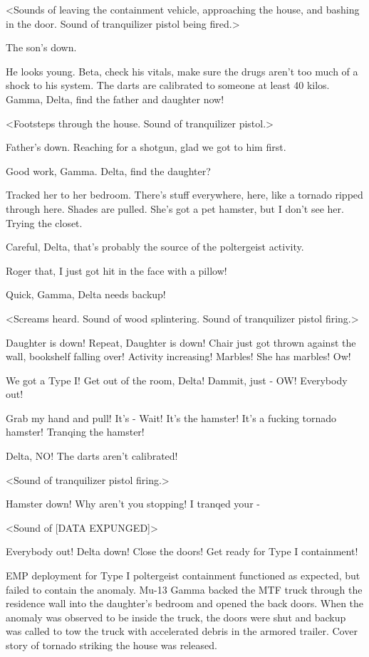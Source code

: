 \begin{scpbox}
<Sounds of leaving the containment vehicle, approaching the house, and bashing in the door. Sound of tranquilizer pistol being fired.>

 The son's down.

 He looks young. Beta, check his vitals, make sure the drugs aren't too much of a shock to his system. The darts are calibrated to someone at least 40 kilos. Gamma, Delta, find the father and daughter now!

<Footsteps through the house. Sound of tranquilizer pistol.>

 Father's down. Reaching for a shotgun, glad we got to him first.

 Good work, Gamma. Delta, find the daughter?

 Tracked her to her bedroom. There's stuff everywhere, here, like a tornado ripped through here. Shades are pulled. She's got a pet hamster, but I don't see her. Trying the closet.

 Careful, Delta, that's probably the source of the poltergeist activity.

 Roger that, I just got hit in the face with a pillow!

 Quick, Gamma, Delta needs backup!

<Screams heard. Sound of wood splintering. Sound of tranquilizer pistol firing.>

 Daughter is down! Repeat, Daughter is down! Chair just got thrown against the wall, bookshelf falling over! Activity increasing! Marbles! She has marbles! Ow!

 We got a Type I! Get out of the room, Delta! Dammit, just - OW! Everybody out!

 Grab my hand and pull! It's - Wait! It's the hamster! It's a fucking tornado hamster! Tranqing the hamster!

 Delta, NO! The darts aren't calibrated!

<Sound of tranquilizer pistol firing.>

 Hamster down! Why aren't you stopping! I tranqed your -

<Sound of {[}DATA EXPUNGED]>

 Everybody out! Delta down! Close the doors! Get ready for Type I containment!


 EMP deployment for Type I poltergeist containment functioned as expected, but failed to contain the anomaly. Mu-13 Gamma backed the MTF truck through the residence wall into the daughter's bedroom and opened the back doors. When the anomaly was observed to be inside the truck, the doors were shut and backup was called to tow the truck with accelerated debris in the armored trailer. Cover story of tornado striking the house was released.

\end{scpbox}

